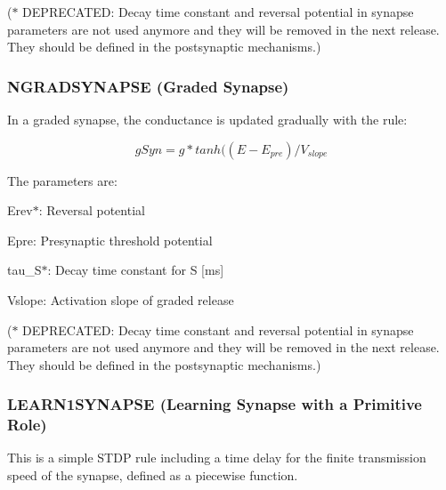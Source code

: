 ($\ast$ D\+E\+P\+R\+E\+C\+A\+T\+E\+D\+: Decay time constant and reversal potential in synapse parameters are not used anymore and they will be removed in the next release. They should be defined in the postsynaptic mechanisms.)\hypertarget{Manual_sect32}{}\subsubsection{N\+G\+R\+A\+D\+S\+Y\+N\+A\+P\+S\+E (\+Graded Synapse)}\label{Manual_sect32}
In a graded synapse, the conductance is updated gradually with the rule\+:

\[ gSyn= g * tanh((E - E_{pre}) / V_{slope} \]

The parameters are\+:
\begin{DoxyItemize}
\item {\ttfamily Erev$\ast$}\+: Reversal potential
\item {\ttfamily Epre\+:} Presynaptic threshold potential
\item {\ttfamily tau\+\_\+\+S$\ast$}\+: Decay time constant for S \mbox{[}ms\mbox{]}
\item {\ttfamily Vslope\+:} Activation slope of graded release
\end{DoxyItemize}

($\ast$ D\+E\+P\+R\+E\+C\+A\+T\+E\+D\+: Decay time constant and reversal potential in synapse parameters are not used anymore and they will be removed in the next release. They should be defined in the postsynaptic mechanisms.)\hypertarget{Manual_sect33}{}\subsubsection{L\+E\+A\+R\+N1\+S\+Y\+N\+A\+P\+S\+E (\+Learning Synapse with a Primitive Role)}\label{Manual_sect33}
This is a simple S\+T\+D\+P rule including a time delay for the finite transmission speed of the synapse, defined as a piecewise function.

